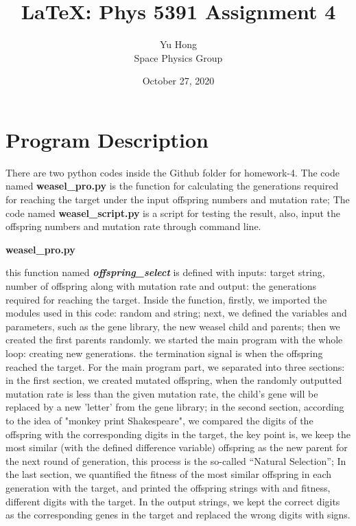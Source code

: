 \documentclass[12pt, letterpaper]{article} %
\begin{document}
\title{\LaTeX: Phys 5391 Assignment 4} %
\author{Yu Hong\\Space Physics Group} %
\date{October 27, 2020}  %
\maketitle %


\section{Program Description} %

There are two python codes inside the Github folder for homework-4. The code named \textbf{weasel\_pro.py} is 
the function for calculating the generations required for reaching the target under the input offspring numbers and 
mutation rate; The code named \textbf{weasel\_script.py} is a script for testing the result, also, input the offspring 
numbers and mutation rate through command line.

 \textbf{weasel\_pro.py}  
 
this function named \textit{\textbf{offspring\_select}} is defined with inputs: target string, number of offspring along with mutation
rate and output: the generations required for reaching the target. Inside the function, firstly, we imported the modules used in this 
code: random and string; next, we defined the variables and parameters, such as the gene library, the new weasel child and parents;
then we created the first parents randomly. we started the main program with the whole loop: creating new generations. the termination 
signal is when the offspring reached the target. For the main program part, we separated into three sections: in the first section, we 
created mutated offspring, when the randomly outputted mutation rate is less than the given mutation rate, the child's gene will be 
replaced by a new 'letter' from the gene library; in the second section, according to the idea of "monkey print Shakespeare", we 
compared the digits of the offspring with the corresponding digits in the target, the key point is, we keep the most similar (with the 
defined difference variable) offspring as the new parent for the next round of generation, this process is the so-called “Natural Selection”; 
In the last section, we quantified the fitness of the most similar offspring in each generation with the target, and printed the offspring 
strings with and fitness, different digits with the target. In the output strings, we kept the correct digits as the corresponding genes in
the target and replaced the wrong digits with \* signs.
 
\end{document}
